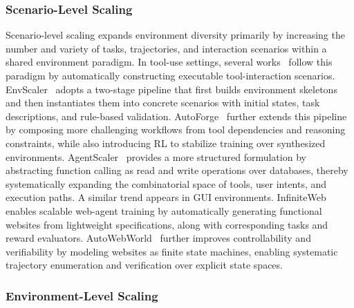 \subsubsection{Scenario-Level Scaling}\label{sec:Scenario-Level Scaling}
Scenario-level scaling expands environment diversity primarily by increasing the number and variety of tasks, trajectories, and interaction scenarios within a shared environment paradigm.
In tool-use settings, several works~\cite{EnvScaler,AutoForge,AgentScaler} follow this paradigm by automatically constructing executable tool-interaction scenarios.
EnvScaler~\cite{EnvScaler} adopts a two-stage pipeline that first builds environment skeletons and then instantiates them into concrete scenarios with initial states, task descriptions, and rule-based validation.
AutoForge~\cite{AutoForge} further extends this pipeline by composing more challenging workflows from tool dependencies and reasoning constraints, while also introducing RL to stabilize training over synthesized environments.
AgentScaler~\cite{AgentScaler} provides a more structured formulation by abstracting function calling as read and write operations over databases, thereby systematically expanding the combinatorial space of tools, user intents, and execution paths.
A similar trend appears in GUI environments. 
InfiniteWeb~\cite{InfiniteWeb} enables scalable web-agent training by automatically generating functional websites from lightweight specifications, along with corresponding tasks and reward evaluators.
AutoWebWorld~\cite{AutoWebWorld} further improves controllability and verifiability by modeling websites as finite state machines, enabling systematic trajectory enumeration and verification over explicit state spaces.
%
\subsubsection{Environment-Level Scaling}\label{sec:Environment-Level Scaling}

